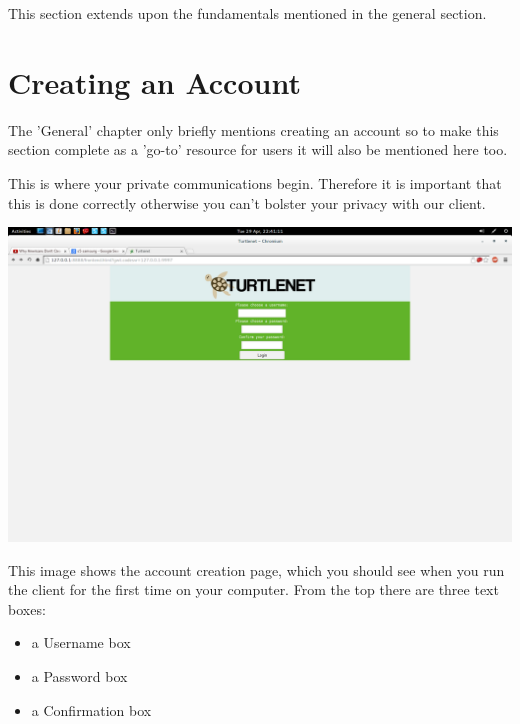 This section extends upon the fundamentals mentioned in the general section.

\section{Creating an Account}
The 'General' chapter only briefly mentions creating an account so to make this
section complete as a 'go-to' resource for users it will also be mentioned here
too.

This is where your private communications begin.  Therefore it is important that
this is done correctly otherwise you can't bolster your privacy with our client.

\includegraphics[scale=0.2]{../Screenshots/Screenshot from 2014-04-29 22-41-11}

This image shows the account creation page, which you should see when you run 
the client for the first time on your computer.  From the top there are three
text boxes:
\begin{itemize}
\item a Username box
\item a Password box
\item a Confirmation box
\end{itemize}

